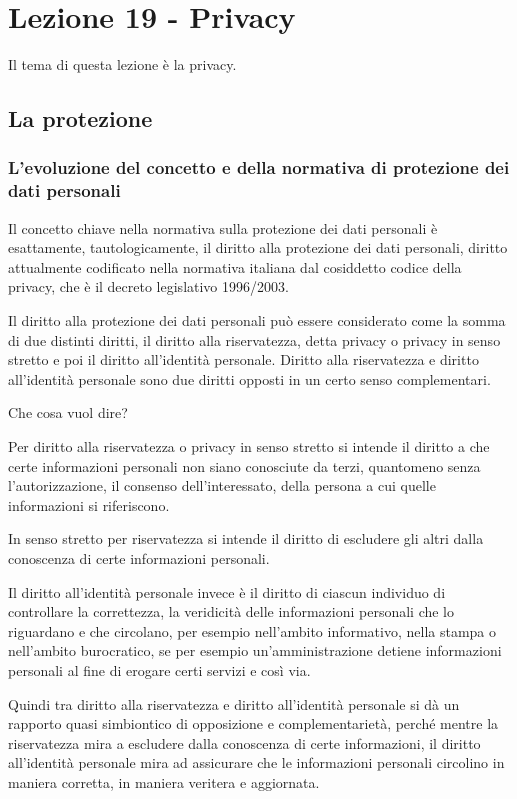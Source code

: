 \chapter{Lezione 19 - Privacy}

Il tema di questa lezione è la privacy. 
\section{La protezione}

\subsection{L'evoluzione del concetto e della normativa di protezione dei dati personali}

Il concetto chiave nella normativa sulla protezione dei dati personali è esattamente, tautologicamente, il diritto alla protezione dei dati personali, diritto attualmente codificato nella normativa italiana dal cosiddetto codice della privacy, che è il decreto legislativo 1996/2003. 

Il diritto alla protezione dei dati personali può essere considerato come la somma di due distinti diritti, il diritto alla riservatezza, detta privacy o privacy in senso stretto e poi il diritto all'identità personale. 
Diritto alla riservatezza e diritto all'identità personale sono due diritti opposti in un certo senso complementari. 

Che cosa vuol dire? 

Per diritto alla riservatezza o privacy in senso stretto si intende il diritto a che certe informazioni personali non siano conosciute da terzi, quantomeno senza l'autorizzazione, il consenso dell'interessato, della persona a cui quelle informazioni si riferiscono.  

In senso stretto per riservatezza si intende il diritto di escludere gli altri dalla conoscenza di certe informazioni personali. 

Il diritto all'identità personale invece è il diritto di ciascun individuo di controllare la correttezza, la veridicità delle informazioni personali che lo riguardano e che circolano, per esempio nell'ambito informativo, nella stampa o nell'ambito burocratico, se per esempio un'amministrazione detiene informazioni personali al fine di erogare certi servizi e così via. 

Quindi tra diritto alla riservatezza e diritto all'identità personale si dà un rapporto quasi simbiontico di opposizione e complementarietà, perché mentre la riservatezza mira a escludere dalla conoscenza di certe informazioni, il diritto all'identità personale mira ad assicurare che le informazioni personali circolino in maniera corretta, in maniera veritera e aggiornata. 

